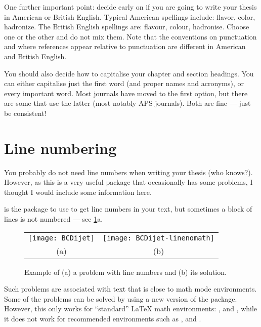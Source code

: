 One further important point: decide early on if you are going to write your thesis in American or British English.
Typical American spellings include: \foreignlanguage{USenglish}{flavor, color, hadronize}.
The British English spellings are: flavour, colour, hadronise.
Choose one or the other and do not mix them.
Note that the conventions on punctuation and where references appear relative to punctuation
are different in American and British English.

You should also decide how to capitalise your chapter and section headings.
You can either capitalise just the first word (and proper names and acronyms),
or every important word.
Most journals have moved to the first option,
but there are some that use the latter (most notably APS journals).
Both are fine --- just be consistent!

\section{Line numbering}%
\label{sec:tips:lineno}

You probably do not need line numbers when writing your
thesis (who knows?). However, as this is a very useful package that
occasionally has some problems, I thought I would include some
information here.

 is the package to use to get line numbers in your text,
but sometimes a block of lines is not numbered --- see \cref{fig:lineno}a.

\begin{figure}[htbp]
  \centering
  \begin{tabular}{cc}
  \texttt{[image: BCDijet]} &
  \texttt{[image: BCDijet-linenomath]}\\
  (a) & (b)
  \end{tabular}
  \caption{Example of (a) a problem with line numbers and (b) its solution.}%
  \label{fig:lineno}
\end{figure}

Such problems are associated with text that is close to math mode
environments. Some of the problems can be solved by using a new
version of the  package.
However, this only works for \enquote{standard} \LaTeX{}
math environments: ,  and , while it does
not work for recommended  environments such as ,
 and . %

